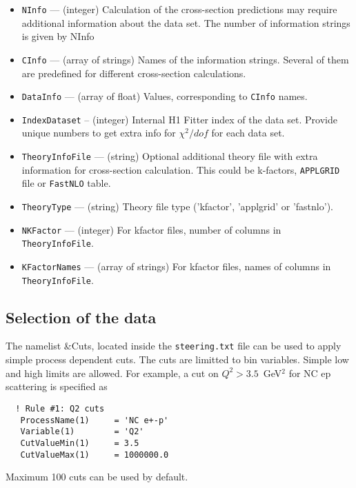 \documentclass[11pt,a4paper]{article}
\begin{document}
\begin{itemize}
      \item {\tt NInfo}       --- (integer) Calculation of the cross-section predictions may 
                      require  additional information about the data set. The number of 
                      information strings is given by NInfo
      \item {\tt CInfo}       --- (array of strings) Names of the information strings. 
                      Several of them are predefined for different cross-section 
                      calculations.
      \item {\tt DataInfo}    --- (array of float) Values, corresponding to {\tt CInfo} names.
      \item {\tt IndexDataset} -- (integer) Internal H1 Fitter index of the data set. Provide unique
                      numbers to get extra info for $\chi^2/dof$ for each data set.      
      \item {\tt TheoryInfoFile} --- (string) Optional additional theory file with extra 
                     information for cross-section calculation. This could be k-factors,
                     {\tt APPLGRID} file or {\tt FastNLO} table.  
      \item {\tt TheoryType} --- (string) Theory file type ('kfactor', 'applgrid' or 'fastnlo').      
      \item {\tt NKFactor}   --- (integer) For kfactor files, number of columns in
                     {\tt TheoryInfoFile}.
      \item {\tt KFactorNames} --- (array of strings) For kfactor files, names of columns in 
                     {\tt TheoryInfoFile}.
\end{itemize}

\subsection{Selection of the data}
  The namelist \&Cuts, located inside the {\tt steering.txt} file can be used to apply
  simple process dependent cuts. The cuts are limitted to bin variables.
  Simple low and high limits are allowed. For example, a cut on $Q^2>3.5$~GeV$^2$ for
  NC ep scattering is specified as

\begin{verbatim}
  ! Rule #1: Q2 cuts
   ProcessName(1)     = 'NC e+-p'
   Variable(1)        = 'Q2'
   CutValueMin(1)     = 3.5 
   CutValueMax(1)     = 1000000.0
\end{verbatim}

  Maximum 100 cuts can be used by default.
\end{document}
